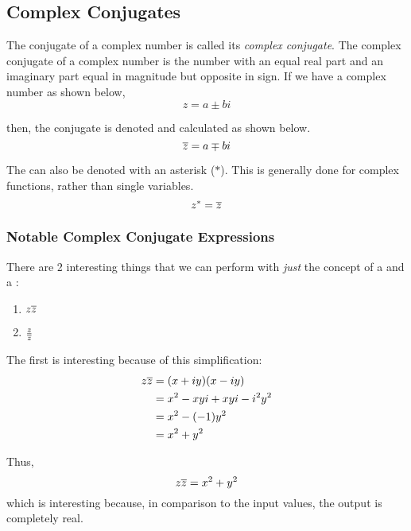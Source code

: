 \subsection{Complex Conjugates}\label{app:Complex_Conjugates}
\begin{definition}\label{def:Complex_Conjugate}
  The conjugate of a complex number is called its \emph{complex conjugate}.
  The complex conjugate of a complex number is the number with an equal real part and an imaginary part equal in magnitude but opposite in sign.
  If we have a complex number as shown below,
  \begin{equation*}
    z = a \pm bi
  \end{equation*}

  then, the conjugate is denoted and calculated as shown below.
  \begin{equation}\label{eq:Complex_Conjugates}
    \overline{z} = a \mp bi
  \end{equation}
\end{definition}

The  can also be denoted with an asterisk ($*$).
This is generally done for complex functions, rather than single variables.
\begin{equation}\label{eq:Complex_Conjugates_Asterisk}
  z^{*} = \overline{z}
\end{equation}

\subsubsection{Notable Complex Conjugate Expressions}\label{subsubsec:Complex_Conjugate_Notable_Expressions}
There are 2 interesting things that we can perform with \textit{just} the concept of a  and a :
\begin{enumerate}
\item $z \overline{z}$
\item $\frac{z}{\overline{z}}$
\end{enumerate}

The first is interesting because of this simplification:
\begin{align*}
  z \overline{z} &= (x + iy) (x - iy) \\
                 &= x^{2} - xyi + xyi - i^{2} y^{2} \\
                 &= x^{2} - (-1) y^{2} \\
                 &= x^{2} + y^{2}
\end{align*}

Thus,
\begin{equation}\label{eq:Complex_Number_Mult_Conjugate}
  z \overline{z} = x^{2} + y^{2}
\end{equation}
which is interesting because, in comparison to the input values, the output is completely real.

